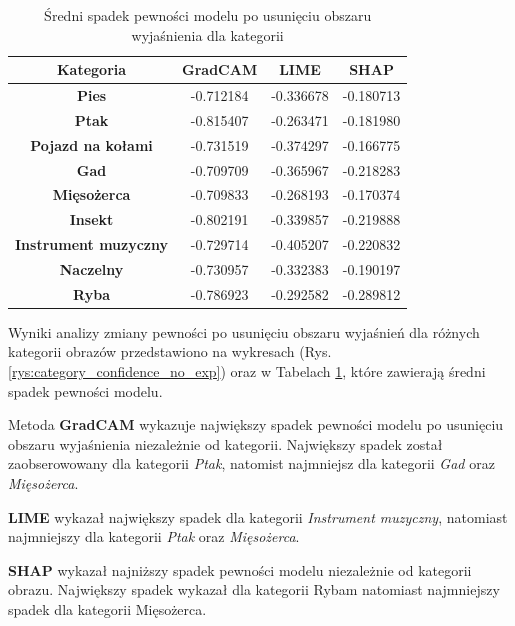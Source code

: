 \begin{table}[h]
	\centering
	\begin{tabular}{|c|c|c|c|}
		\hline
		\textbf{Kategoria}           & \textbf{GradCAM} & \textbf{LIME} & \textbf{SHAP} \\
		\hline
		\textbf{Pies}                & -0.712184        & -0.336678     & -0.180713     \\
		\hline
		\textbf{Ptak}                & -0.815407        & -0.263471     & -0.181980     \\
		\hline
		\textbf{Pojazd na kołami}    & -0.731519        & -0.374297     & -0.166775     \\
		\hline
		\textbf{Gad}                 & -0.709709        & -0.365967     & -0.218283     \\
		\hline
		\textbf{Mięsożerca}          & -0.709833        & -0.268193     & -0.170374     \\
		\hline
		\textbf{Insekt}              & -0.802191        & -0.339857     & -0.219888     \\
		\hline
		\textbf{Instrument muzyczny} & -0.729714        & -0.405207     & -0.220832     \\
		\hline
		\textbf{Naczelny}            & -0.730957        & -0.332383     & -0.190197     \\
		\hline
		\textbf{Ryba}                & -0.786923        & -0.292582     & -0.289812     \\
		\hline
	\end{tabular}
	\caption{Średni spadek pewności modelu po usunięciu obszaru wyjaśnienia dla kategorii}
	\label{tab:category_confidence_no_exp}
\end{table}

Wyniki analizy zmiany pewności po usunięciu obszaru wyjaśnień dla różnych kategorii obrazów przedstawiono na wykresach (Rys. \ref{rys:category_confidence_no_exp}) oraz w Tabelach \ref{tab:category_confidence_no_exp}, które zawierają średni spadek pewności modelu.

Metoda \textbf{GradCAM} wykazuje największy spadek pewności modelu po usunięciu obszaru wyjaśnienia niezależnie od kategorii.
Największy spadek został zaobserowowany dla kategorii \textit{Ptak}, natomist najmniejsz dla kategorii \textit{Gad} oraz \textit{Mięsożerca}.

\textbf{LIME} wykazał największy spadek dla kategorii \textit{Instrument muzyczny}, natomiast najmniejszy dla kategorii \textit{Ptak} oraz \textit{Mięsożerca}.

\textbf{SHAP} wykazał najniższy spadek pewności modelu niezależnie od kategorii obrazu.
Największy spadek wykazał dla kategorii Rybam natomiast najmniejszy spadek dla kategorii Mięsożerca.

